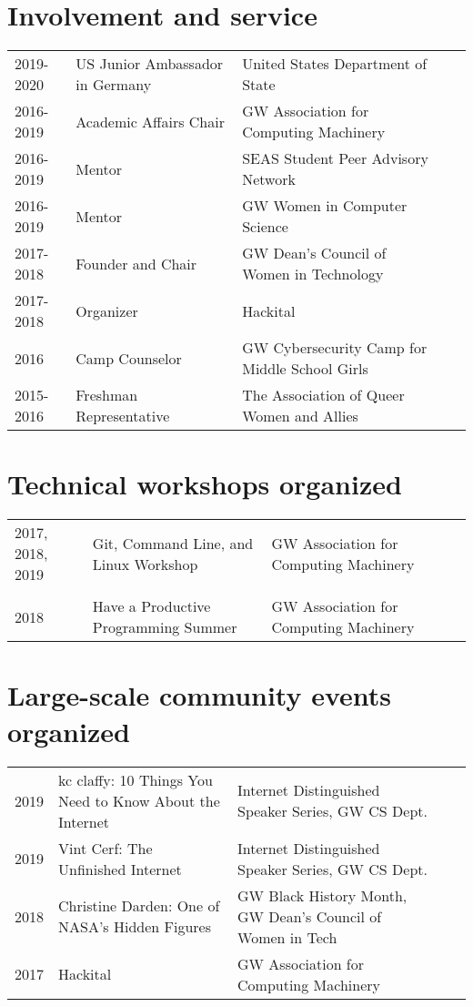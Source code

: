 \documentclass[a4paper,10pt]{article}
\begin{document}
\section{Involvement and service }
{\def\next{\\\\[-0.2cm]}\fontsize{10}{12pt}\selectfont
\begin{tabular}{@{}lP{6.3cm}lP{8.3cm}r@{}}
2019-2020     &  US Junior Ambassador in Germany  & United States Department of State \\
2016-2019 	  &  Academic Affairs Chair  & GW Association for Computing Machinery\\
2016-2019     &  Mentor  & SEAS Student Peer Advisory Network\\
2016-2019     &  Mentor  & GW Women in Computer Science\\
2017-2018	    &  Founder and Chair & GW Dean's Council of Women in Technology \\
2017-2018     &  Organizer & Hackital \\
2016          &  Camp Counselor &  GW Cybersecurity Camp for Middle School Girls\\
2015-2016     &  Freshman Representative   & The Association of Queer Women and Allies
\end{tabular}

\section{Technical workshops organized}

{\def\next{\\\\[-0.2cm]}\fontsize{10}{12pt}\selectfont
\begin{tabular}{@{}lP{6.55cm}lP{8.3cm}r@{}}
2017, 2018, 2019   &   Git, Command Line, and Linux Workshop & GW Association for Computing Machinery \next
2018        &   Have a Productive Programming Summer & GW Association for Computing Machinery

\end{tabular}}

\section{Large-scale community events organized}
\begin{tabular}{@{}lP{8.3cm}lP{6.3cm}r@{}}
2019  &   kc claffy: 10 Things You Need to Know About the Internet & Internet Distinguished Speaker Series, GW CS Dept.\\
2019  &   Vint Cerf: The Unfinished Internet & Internet Distinguished Speaker Series, GW CS Dept.\\
2018  &   Christine Darden: One of NASA's Hidden Figures & GW Black History Month, GW Dean's Council of Women in Tech \\
2017  &   Hackital & GW Association for Computing Machinery


\end{tabular}}
\end{document}
